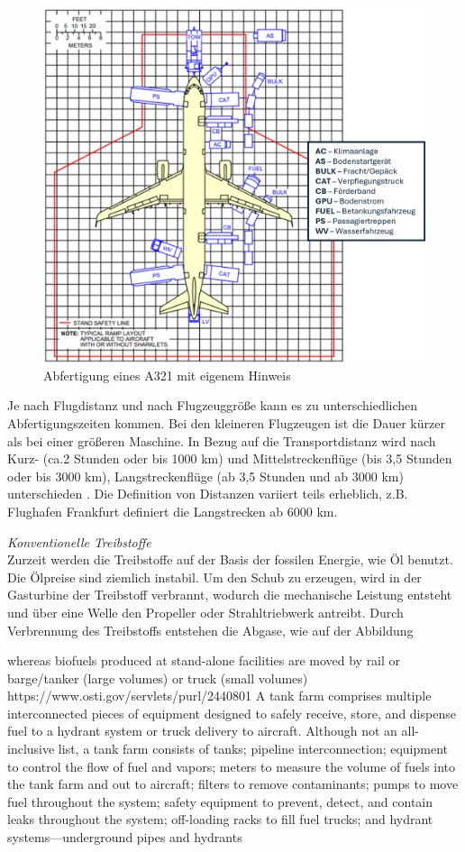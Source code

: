 \begin{figure}[h]
	\centering
	\includegraphics[width=0.8\linewidth]{Bilder/A321_Abfertigung.png}
	\caption[Abfertigung]{Abfertigung eines A321 \cite{airbus2022a321} mit eigenem Hinweis}
	\label{abfertigung}
\end{figure}

Je nach Flugdistanz und nach Flugzeuggröße kann es zu unterschiedlichen Abfertigungszeiten kommen. Bei den kleineren Flugzeugen ist die Dauer 
kürzer als bei einer größeren Maschine. 
In Bezug auf die Transportdistanz wird nach Kurz- (ca.2 Stunden oder bis 1000 km) 
und Mittelstreckenflüge (bis 3,5 Stunden oder bis 3000 km), Langstreckenflüge (ab 3,5 Stunden und ab 3000 km) unterschieden \cite{mensen2013handbuch}.
Die Definition von Distanzen variiert teils erheblich, z.B. Flughafen Frankfurt definiert die Langstrecken ab 6000 km.%

\textit{Konventionelle Treibstoffe}\\
Zurzeit werden die Treibstoffe auf der Basis der fossilen Energie, wie Öl benutzt. Die Ölpreise sind ziemlich instabil. %
Um den Schub zu erzeugen, wird in der Gasturbine der Treibstoff verbrannt, wodurch die mechanische Leistung entsteht 
und über eine Welle den Propeller oder Strahltriebwerk antreibt. Durch Verbrennung des Treibstoffs entstehen die Abgase, wie auf der Abbildung


whereas biofuels produced at stand-alone facilities are
moved by rail or barge/tanker (large volumes) or truck (small volumes)
https://www.osti.gov/servlets/purl/2440801
A tank farm
comprises multiple interconnected pieces of equipment designed to safely receive, store, and
dispense fuel to a hydrant system or truck delivery to aircraft. Although not an all-inclusive list, a
tank farm consists of tanks; pipeline interconnection; equipment to control the flow of fuel and
vapors; meters to measure the volume of fuels into the tank farm and out to aircraft; filters to
remove contaminants; pumps to move fuel throughout the system; safety equipment to prevent,
detect, and contain leaks throughout the system; off-loading racks to fill fuel trucks; and hydrant
systems—underground pipes and hydrants

